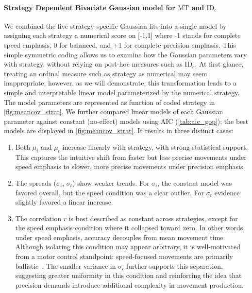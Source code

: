 \documentclass[acmlarge, manuscript,review]{acmart}
\newcommand{\mmt}{\ensuremath{\overline{\mt}}\xspace}
\newcommand{\mt}{\ensuremath{{\text{MT}}}\xspace}
\newcommand{\ide}{\ensuremath{{\text{ID}_e}}\xspace}
\begin{document}
\begin{figure}[htbp]
	\centering
	
\end{figure}





\begin{figure}[htbp]
	\centering
	
\end{figure}



\paragraph{Strategy Dependent Bivariate Gaussian model for \mmt and \ide}
We combined the five strategy-specific Gaussian fits into a single model by assigning each strategy a numerical score on [-1,1] where -1 stands for complete speed emphasis, 0 for balanced, and +1 for complete precision emphasis. This simple symmetric coding allows us to examine how the Gaussian parameters vary with strategy, without relying on post-hoc measures such as \ide.
At first glance, treating an ordinal measure such as strategy as numerical may seem inappropriate; however, as we will demonstrate, this transformation leads to a simple and interpretable linear model parameterized by the numerical strategy.
The model parameters are represented as function of coded strategy in \autoref{fig:meancov_strat}. We further compared linear models of each Gaussian parameter against constant (no-effect) models using AIC (\autoref{tab:aic_gop}); the best models are displayed in \autoref{fig:meancov_strat}. It results in three distinct cases:
\begin{enumerate}
	\item Both $\mu_i$ and $\mu_t$ increase linearly with strategy, with strong statistical support. This captures the intuitive shift from faster but less precise movements under speed emphasis to slower, more precise movements under precision emphasis.
	\item The spreads ($\sigma_i$, $\sigma_t$) show weaker trends. For $\sigma_i$, the constant model was favored overall, but the speed condition was a clear outlier. For $\sigma_t$ evidence slightly favored a linear increase.
	\item The correlation $r$ is best described as constant across strategies, except for the speed emphasis condition where it collapsed toward zero. In other words, under speed emphasis, accuracy decouples from mean movement time. Although isolating this condition may appear arbitrary, it is well-motivated from a motor control standpoint: speed-focused movements are primarily ballistic~\cite{elliott2017}. The smaller variance in $\sigma_i$ further supports this separation, suggesting greater uniformity in this condition and reinforcing the idea that precision demands introduce additional complexity in movement production.
\end{enumerate}
\end{document}
